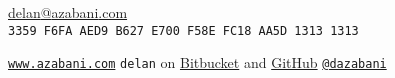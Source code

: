 \documentclass[a4paper,12pt]{article}
\begin{document}
\hrulefill

\hspace{5mm}\begin{minipage}{110mm}
	                    \href{mailto:delan@azabani.com}{\Huge{delan\textcolor{lg}{@}azabani\textcolor{lg}{.com}}}
	\vspace{0.5em}  \\  {\texttt{\textcolor{lg}{3359 F6FA AED9 B627 E700 F58E FC18 AA5D 1313 1313}}}
\end{minipage}\hfill\begin{minipage}{50mm}
\end{minipage}\hspace{5mm}

\hrulefill

\vspace{-1ex}\hspace{5mm}\begin{minipage}{160mm}%
	\texttt{\href{https://www.azabani.com/about/}{www.azabani.com}}
	\hfill
	\texttt{delan} on
	\href{https://bitbucket.org/delan/}{Bitbucket} and
	\href{https://github.com/delan}{GitHub}
	\hfill
	\texttt{\href{https://twitter.com/dazabani}{@dazabani}}
\end{minipage}\hspace{5mm}\vspace{-2ex}

\hrulefill

\vspace{1em}
\end{document}
